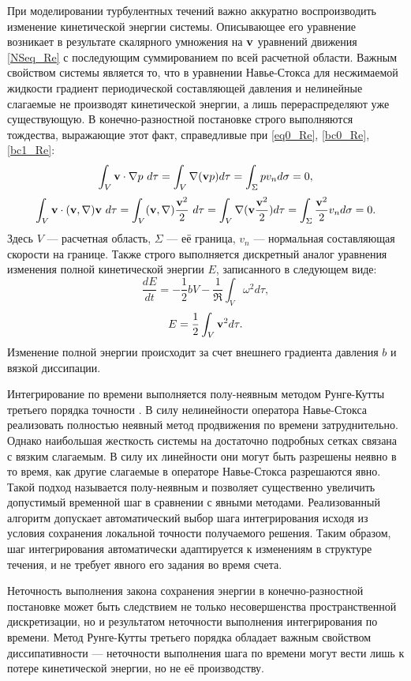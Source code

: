 При моделировании турбулентных течений важно аккуратно воспроизводить изменение кинетической энергии системы. Описывающее его уравнение возникает в результате скалярного умножения на $\mathbf{v}$ уравнений движения \eqref{NSeq_Re} с последующим суммированием по всей расчетной области. Важным свойством системы является то, что в уравнении Навье-Стокса для несжимаемой жидкости градиент периодической составляющей давления и нелинейные слагаемые не производят кинетической энергии, а лишь перераспределяют уже существующую. В конечно-разностной постановке строго выполняются тождества, выражающие этот факт, справедливые при \eqref{eq0_Re}, \eqref{bc0_Re}, \eqref{bc1_Re}:
$$
\int_V \mathbf{v} \cdot \nabla p\ d\tau= \int_V \nabla (\mathbf{v} p) d\tau = \int_{\Sigma} p v_n d\sigma = 0, 
$$
$$
\int_V \mathbf{v} \cdot (\mathbf{v}, \nabla) \mathbf{v}\ d\tau = \int_V (\mathbf{v}, \nabla)\frac{\mathbf{v}^2}{2}\ d\tau = \int_V \nabla (\mathbf{v} \frac{\mathbf{v}^2}{2}) d\tau = \int_{\Sigma} \frac{\mathbf{v}^2}{2} v_n d\sigma = 0.
$$
Здесь $V$ --- расчетная область, $\Sigma$ --- её граница, $v_n$ --- нормальная составляющая скорости на границе. Также строго выполняется дискретный аналог уравнения изменения полной кинетической энергии $E$, записанного в следующем виде:
\begin{equation} \label{Eeq}
\frac{d E}{d t} = - \frac{1}{2}bV - \frac{1}{\Re} \int_{V} \omega^2 d\tau,
\end{equation}
$$
E = \frac{1}{2}\int_{V} \mathbf{v}^2 d\tau.
$$
Изменение полной энергии происходит за счет внешнего градиента давления $b$ и вязкой диссипации. 

Интегрирование по времени выполняется полу-неявным методом Рунге-Кутты третьего порядка точности \cite{Nikitin2006third}. В силу нелинейности оператора Навье-Стокса реализовать полностью неявный метод продвижения по времени затруднительно. Однако наибольшая жесткость системы на достаточно подробных сетках связана с вязким слагаемым. В силу их линейности они могут быть разрешены неявно в то время, как другие слагаемые в операторе Навье-Стокса разрешаются явно. Такой подход называется полу-неявным и позволяет существенно увеличить допустимый временной шаг в сравнении с явными методами. Реализованный алгоритм допускает автоматический выбор шага интегрирования исходя из условия сохранения локальной точности получаемого решения. Таким образом, шаг интегрирования автоматически адаптируется к изменениям в структуре течения, и не требует явного его задания во время счета. 

Неточность выполнения закона сохранения энергии в конечно-разностной постановке может быть следствием не только несовершенства пространственной дискретизации, но и результатом неточности выполнения интегрирования по времени. Метод Рунге-Кутты третьего порядка обладает важным свойством диссипативности --- неточности выполнения шага по времени могут вести лишь к потере кинетической энергии, но не её производству. 

